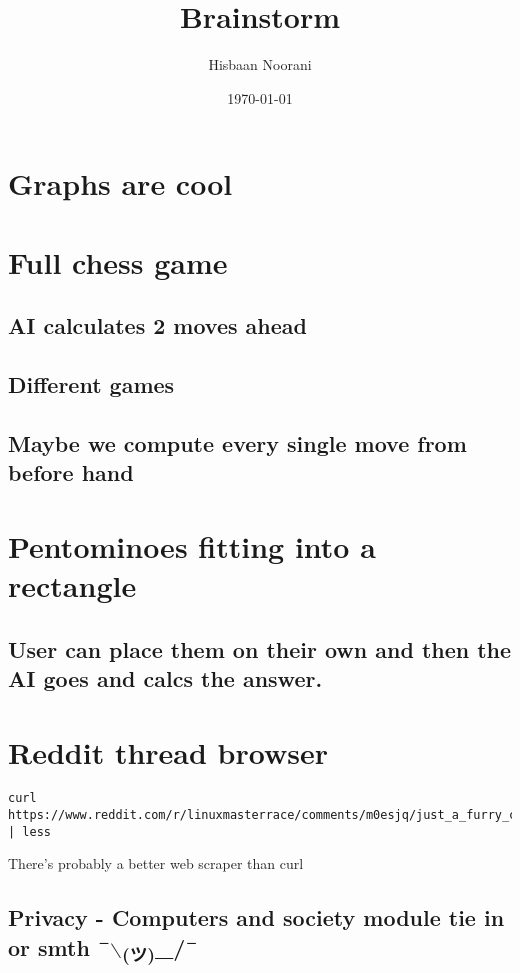 \documentclass[11pt]{article}
\author{Hisbaan Noorani}
\date{\today}
\title{Brainstorm}
\begin{document}
\maketitle
\tableofcontents


\section{Graphs are cool}
\label{sec:orgf874a82}
\section{Full chess game}
\label{sec:orgae5b482}
\subsection{AI calculates 2 moves ahead}
\label{sec:orgdcd3ce2}
\subsection{Different games}
\label{sec:org51cce5d}
\subsection{Maybe we compute every single move from before hand}
\label{sec:orga296a51}
\section{Pentominoes fitting into a rectangle}
\label{sec:orga8a0bb0}
\subsection{User can place them on their own and then the AI goes and calcs the answer.}
\label{sec:orge6bd30f}
\section{Reddit thread browser}
\label{sec:orgdd66c84}
\begin{verbatim}
curl https://www.reddit.com/r/linuxmasterrace/comments/m0esjq/just_a_furry_compilation_of_distro_logos/ | less
\end{verbatim}
There's probably a better web scraper than curl
\subsection{Privacy - Computers and society module tie in or smth ¯$\backslash$\textsubscript{(ツ)}\_/¯}
\label{sec:org5612072}
\end{document}
